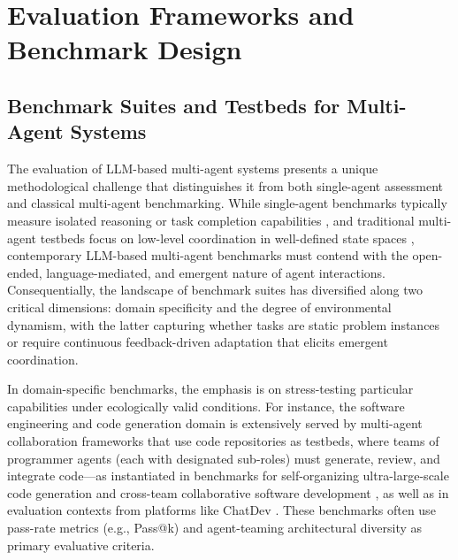 \documentclass[11pt,a4paper]{article}
\begin{document}
\section{Evaluation Frameworks and Benchmark Design}



\subsection{Benchmark Suites and Testbeds for Multi-Agent Systems}


The evaluation of LLM-based multi-agent systems presents a unique methodological challenge that distinguishes it from both single-agent assessment and classical multi-agent benchmarking. While single-agent benchmarks typically measure isolated reasoning or task completion capabilities \cite{arxiv:2308.03688v2,arxiv:2406.04151v1}, and traditional multi-agent testbeds focus on low-level coordination in well-defined state spaces \cite{arxiv:1803.05464v1}, contemporary LLM-based multi-agent benchmarks must contend with the open-ended, language-mediated, and emergent nature of agent interactions. Consequentially, the landscape of benchmark suites has diversified along two critical dimensions: domain specificity and the degree of environmental dynamism, with the latter capturing whether tasks are static problem instances or require continuous feedback-driven adaptation that elicits emergent coordination.

In domain-specific benchmarks, the emphasis is on stress-testing particular capabilities under ecologically valid conditions. For instance, the software engineering and code generation domain is extensively served by multi-agent collaboration frameworks that use code repositories as testbeds, where teams of programmer agents (each with designated sub-roles) must generate, review, and integrate code---as instantiated in benchmarks for self-organizing ultra-large-scale code generation and cross-team collaborative software development \cite{arxiv:2404.02183v1,arxiv:2406.08979v1}, as well as in evaluation contexts from platforms like ChatDev \cite{arxiv:2406.07155v1}. These benchmarks often use pass-rate metrics (e.g., Pass@k) and agent-teaming architectural diversity as primary evaluative criteria.
\end{document}
